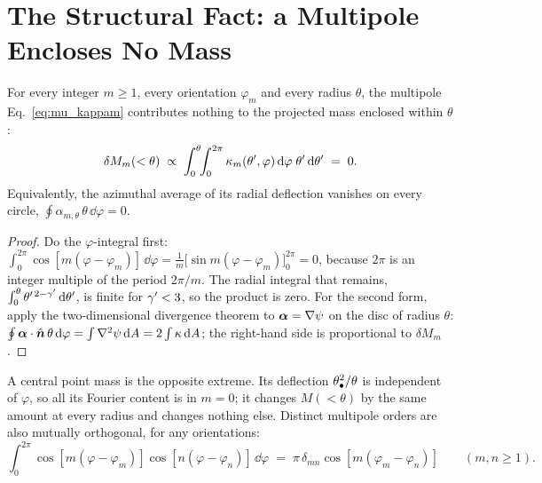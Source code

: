 \section{The Structural Fact: a Multipole Encloses No Mass}
\label{sec:mu_zero_mass}

\begin{theorem}
\label{thm:mu_zero_mass}
For every integer $m\ge1$, every orientation $\varphi_m$ and every
radius $\theta$, the multipole Eq.~\eqref{eq:mu_kappam} contributes
nothing to the projected mass enclosed within $\theta$:
\begin{equation}
    \delta M_m(<\theta) \;\propto\;
    \int_0^{\theta}\!\!\int_0^{2\pi}\kappa_m(\theta',\varphi)\,
    \dd\varphi\;\theta'\,\dd\theta' \;=\; 0 .
    \label{eq:mu_zero_mass}
\end{equation}
Equivalently, the azimuthal average of its radial deflection vanishes
on every circle, $\oint\alpha_{m,\theta}\,\theta\,\dd\varphi = 0$.
\end{theorem}

\begin{proof}
Do the $\varphi$-integral first:
$\int_0^{2\pi}\cos[m(\varphi-\varphi_m)]\,\dd\varphi =
\tfrac1m\big[\sin m(\varphi-\varphi_m)\big]_0^{2\pi} = 0$, because $2\pi$
is an integer multiple of the period $2\pi/m$.  The radial integral that
remains, $\int_0^\theta\theta'^{\,2-\gamma'}\,\dd\theta'$, is finite for
$\gamma'<3$, so the product is zero.  For the second form, apply the
two-dimensional divergence theorem to $\boldsymbol{\alpha}=\nabla\psi$ on the
disc of radius $\theta$:
$\oint\boldsymbol{\alpha}\cdot\hat{\boldsymbol n}\,\theta\,\dd\varphi =
\int\nabla^2\psi\,\dd A = 2\int\kappa\,\dd A$; the right-hand side is
proportional to $\delta M_m$.
\end{proof}

A central point mass is the opposite extreme.  Its deflection
$\theta_{\bullet}^2/\theta$ is independent of $\varphi$, so all its Fourier
content is in $m=0$; it changes $M(<\theta)$ by the same amount at
every radius and changes nothing else.  Distinct multipole orders are
also mutually orthogonal, for any orientations:
\begin{equation}
    \int_0^{2\pi}\cos[m(\varphi-\varphi_m)]\cos[n(\varphi-\varphi_n)]\,\dd\varphi
    \;=\; \pi\,\delta_{mn}\cos[m(\varphi_m-\varphi_n)]
    \qquad(m,n\ge1).
    \label{eq:mu_orthogonality}
\end{equation}

